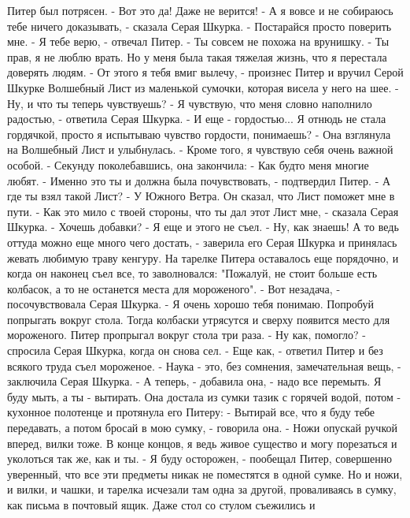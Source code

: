     Питер был потрясен.
    - Вот это да! Даже не верится!
    - А я вовсе и не собираюсь тебе ничего доказывать, - сказала Серая 
Шкурка. - Постарайся просто поверить мне.
    - Я тебе верю, - отвечал Питер. - Ты совсем не похожа на врунишку.
    - Ты прав, я не люблю врать. Но у меня была такая тяжелая жизнь, 
что я перестала доверять людям.
    - От этого я тебя вмиг вылечу, - произнес Питер и вручил Серой 
Шкурке Волшебный Лист из маленькой сумочки, которая висела у него на 
шее. - Ну, и что ты теперь чувствуешь?
    - Я чувствую, что меня словно наполнило радостью, - ответила Серая 
Шкурка. - И еще - гордостью... Я отнюдь не стала гордячкой, просто я 
испытываю чувство гордости, понимаешь? - Она взглянула на Волшебный 
Лист и улыбнулась. - Кроме того, я чувствую себя очень важной особой. 
- Секунду поколебавшись, она закончила: - Как будто меня многие любят.
    - Именно это ты и должна была почувствовать, - подтвердил Питер.
    - А где ты взял такой Лист?
    - У Южного Ветра. Он сказал, что Лист поможет мне в пути.
    - Как это мило с твоей стороны, что ты дал этот Лист мне, - 
сказала Серая Шкурка. - Хочешь добавки?
    - Я еще и этого не съел.
    - Ну, как знаешь! А то ведь оттуда можно еще много чего достать, - 
заверила его Серая Шкурка и принялась жевать любимую траву кенгуру.
    На тарелке Питера оставалось еще порядочно, и когда он наконец 
съел все, то заволновался: "Пожалуй, не стоит больше есть колбасок, а 
то не останется места для мороженого".
    - Вот незадача, - посочувствовала Серая Шкурка. - Я очень хорошо 
тебя понимаю. Попробуй попрыгать вокруг стола. Тогда колбаски 
утрясутся и сверху появится место для мороженого.
    Питер пропрыгал вокруг стола три раза.
    - Ну как, помогло? - спросила Серая Шкурка, когда он снова сел.
    - Еще как, - ответил Питер и без всякого труда съел мороженое.
    - Наука - это, без сомнения, замечательная вещь, - заключила Серая 
Шкурка. - А теперь, - добавила она, - надо все перемыть. Я буду мыть, 
а ты - вытирать.
    Она достала из сумки тазик с горячей водой, потом - кухонное 
полотенце и протянула его Питеру: - Вытирай все, что я буду тебе 
передавать, а потом бросай в мою сумку, - говорила она. - Ножи опускай 
ручкой вперед, вилки тоже. В конце концов, я ведь живое существо и 
могу порезаться и уколоться так же, как и ты.
    - Я буду осторожен, - пообещал Питер, совершенно уверенный, что 
все эти предметы никак не поместятся в одной сумке. Но и ножи, и 
вилки, и чашки, и тарелка исчезали там одна за другой, проваливаясь в 
сумку, как письма в почтовый ящик. Даже стол со стулом съежились и 
